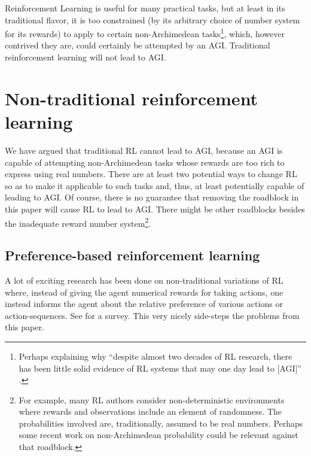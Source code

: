 \documentclass[reqno]{article}
\theoremstyle{definition}
\begin{document}
Reinforcement Learning is useful for many practical tasks, but at least in
its traditional flavor, it is too constrained (by its arbitrary choice of number
system for its rewards) to apply to certain
non-Archimedean tasks\footnote{Perhaps explaining why
``despite almost two decades of RL research, there has been little solid
evidence of RL systems that may one day lead to [AGI]''
\cite{livingston}.}, which, however contrived they are, could certainly be
attempted by an AGI. Traditional reinforcement learning will not lead to AGI.


\section{Non-traditional reinforcement learning}
\label{nontraditionalsection}

We have argued that traditional RL cannot lead to AGI, because
an AGI is capable of attempting non-Archimedean tasks whose rewards are
too rich to express using real numbers. There are at least two
potential ways to change RL so as to make it applicable to such tasks and,
thus, at least potentially capable of leading to AGI. Of course, there is
no guarantee that removing the roadblock in this paper will cause RL to
lead to AGI. There might be other roadblocks besides the inadequate reward
number system\footnote{For example, many RL authors consider non-deterministic
environments where rewards and observations include an element of
randomness. The probabilities involved are, traditionally, assumed to be
real numbers. Perhaps some recent work \cite{benci2013non} on non-Archimedean
probability could be relevant against that roadblock.}.

\subsection{Preference-based reinforcement learning}

A lot of exciting research has been done on non-traditional variations
of RL where, instead of giving the agent numerical rewards for taking actions,
one instead informs the agent about the relative preference of various
actions or action-sequences. See \cite{wirth2017survey} for a survey.
This very nicely side-steps the problems from this paper.
\end{document}
